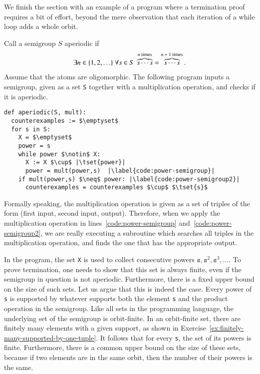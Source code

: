 We finish the section with an  example of a program where a termination proof requires a bit of effort, beyond the mere observation that each iteration of a while loop adds a whole orbit. 
\begin{myexample}
	Call a semigroup $S$ aperiodic if 
	\begin{align*}
		\exists n \in \{1,2,\ldots\} \ \forall s \in S \ \overbrace{s \cdots s}^{\text{$n$ times}}= \overbrace{s \cdots s}^{\text{$n+1$ times}}.
	\end{align*} 
Assume that the atoms are oligomorphic.  The following program inputs a semigroup, given as a set \texttt{S} together with  a multiplication operation, and checks if it is aperiodic. 
	\begin{lstlisting}
def aperiodic(S, mult):
  counterexamples := $\emptyset$
  for s in S:
	X = $\emptyset$
	power = s
	while power $\notin$ X:
	  X := X $\cup$ |\tset{power}|
	  power = mult(power,s)  |\label{code:power-semigroup}|
	if mult(power,s) $\neq$ power: |\label{code:power-semigroup2}|
	  counterexamples = counterexamples $\cup$ $\tset{s}$
  \end{lstlisting}
  Formally speaking, the multiplication operation is given as a set of triples of the form (first input, second input, output). Therefore, when we apply  the multiplication operation in lines~\ref{code:power-semigroup} and~\ref{code:power-semigroup2}, we are really executing a subroutine which searches all triples in the multiplication operation, and finds the one that has the appropriate output.
	
	In the program, the set \texttt{X} is used to collect consecutive powers $\mathtt{s}, \mathtt{s}^2, \mathtt s^3,\ldots$. To prove termination, one needs to show that this set is always finite, even if the semigroup in question is not aperiodic. Furthermore, there is a fixed upper bound on the size of such sets. Let us argue that this is indeed the case.   Every power of \texttt{s}  is supported by whatever supports both the element  \texttt{s} and the product operation in the semigroup. Like all sets in the programming language,  the underlying set of the semigroup is orbit-finite. In an orbit-finite set,  there are finitely many elements with a given support, as shown in Exercise~\ref{ex:finitely-many-supported-by-one-tuple}. It follows that for every \texttt{s}, the set of its powers is finite. Furthermore, there is a common upper bound on the size of these sets, because if two elements are in the same orbit, then the number of their powers is the same.
\end{myexample}







